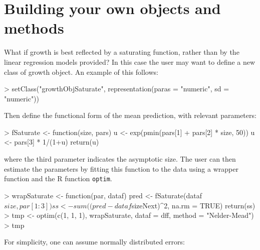 \documentclass{article}
\begin{document}
\section{Building your own objects and methods}
What if growth is best reflected by a saturating function, rather than by the
linear regression models provided?  In this case the user may want to define a
new class of growth object.  An example of this follows:
\begin{Schunk}
\begin{Sinput}
> setClass("growthObjSaturate", representation(paras = "numeric", sd = "numeric"))
\end{Sinput}
\end{Schunk}
Then define the functional form of the mean prediction, with relevant parameters: 
\begin{Schunk}
\begin{Sinput}
> fSaturate <- function(size, pars) { 
      u <- exp(pmin(pars[1] + pars[2] * size, 50))
      u <- pars[3] * 1/(1+u)
      return(u)
  }
\end{Sinput}
\end{Schunk}
where the third parameter indicates the asymptotic size. The user can then
estimate the parameters by fitting this function to the data using a wrapper
function and the R function {\tt optim}.
\begin{Schunk}
\begin{Sinput}
> wrapSaturate <- function(par, dataf) { 
      pred <- fSaturate(dataf$size, par[1:3])
      ss <- sum((pred - dataf$sizeNext)^2, na.rm = TRUE)
      return(ss)
      }
> tmp <- optim(c(1, 1, 1), wrapSaturate, dataf = dff, method = "Nelder-Mead")
> tmp    
\end{Sinput}
\end{Schunk}

For simplicity, one can assume normally distributed errors: 

\begin{Schunk}
\end{Schunk}
\end{document}
